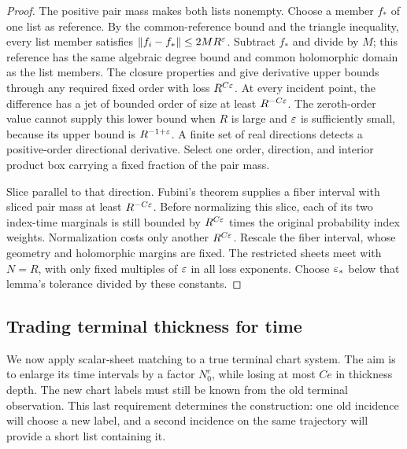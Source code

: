 \begin{proof}
The positive pair mass makes both lists nonempty.  Choose a member
\(f_*\) of one list as reference.  By the common-reference bound
and the triangle inequality, every list member satisfies
\(\|f_i-f_*\|\le2MR^\varepsilon\).  Subtract \(f_*\) and divide by \(M\);
this reference has the same algebraic degree bound and common
holomorphic domain as the list members.
The closure properties and  give derivative
upper bounds through any required fixed order with loss \(R^{C\varepsilon}\).
At every incident point, the difference has a jet of bounded order
of size at least \(R^{-C\varepsilon}\).  The zeroth-order value cannot
supply this lower bound when \(R\) is large and \(\varepsilon\) is
sufficiently small, because its upper bound is \(R^{-1+\varepsilon}\).
A finite set of real directions detects a positive-order
directional derivative.  Select one order, direction, and interior
product box carrying a fixed fraction of the pair mass.

Slice parallel to that direction.  Fubini's theorem supplies a
fiber interval with sliced pair mass at least \(R^{-C\varepsilon}\).
Before normalizing this slice, each of its two index-time
marginals is still bounded by \(R^{C\varepsilon}\) times the original
probability index weights.  Normalization costs only another
\(R^{C\varepsilon}\).  Rescale the fiber interval, whose geometry and
holomorphic margins are fixed.  The restricted sheets meet
 with \(N=R\), with only fixed
multiples of \(\varepsilon\) in all loss exponents.  Choose \(\varepsilon_*\)
below that lemma's tolerance divided by these constants.
\end{proof}


\subsection{Trading terminal thickness for time}
\label{a02:terminal-extension-subsection}

We now apply scalar-sheet matching to a true terminal chart system.
The aim is to enlarge its time intervals by a factor \(N_0^e\),
while losing at most \(Ce\) in thickness depth. The new chart labels
must still be known from the old terminal observation. This last
requirement determines the construction: one old incidence will choose
a new label, and a second incidence on the same trajectory will provide
a short list containing it.

